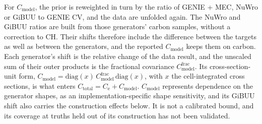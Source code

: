 For $C_{\mathrm{model}}$, the prior is reweighted in turn by the ratio of GENIE + MEC, NuWro or GiBUU to GENIE CV, and the data are unfolded again. The NuWro and GiBUU ratios are built from those generators' carbon samples, without a correction to CH. Their shifts therefore include the difference between the targets as well as between the generators, and the reported $C_{\mathrm{model}}$ keeps them on carbon. Each generator's shift is the relative change of the data result, and the unscaled sum of their outer products is the fractional covariance $C_{\mathrm{model}}^{\mathrm{frac}}$. Its cross-section-unit form, $C_{\mathrm{model}}=\mathrm{diag}(x)\,C_{\mathrm{model}}^{\mathrm{frac}}\,\mathrm{diag}(x)$, with $x$ the cell-integrated cross sections, is what enters $C_{\mathrm{total}}=C_{\mathrm{e}}+C_{\mathrm{model}}$. $C_{\mathrm{model}}$ represents dependence on the generator shapes, as an implementation-specific shape sensitivity, and its GiBUU shift also carries the construction effects below. It is not a calibrated bound, and its coverage at truths held out of its construction has not been validated.

